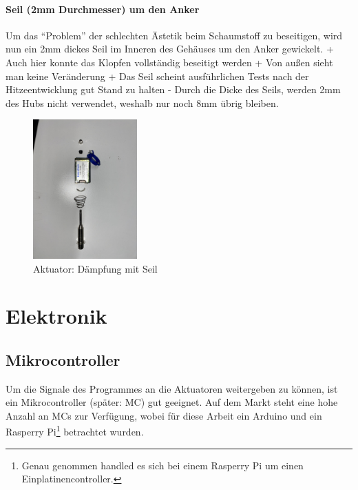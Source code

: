 \paragraph{Seil (2mm Durchmesser) um den Anker}

Um das \enquote{Problem} der schlechten Ästetik beim Schaumstoff zu beseitigen, wird nun ein 2mm dickes Seil im Inneren des Gehäuses um den Anker gewickelt. \newline
+ Auch hier konnte das Klopfen vollständig beseitigt werden \newline
+ Von außen sieht man keine Veränderung \newline
+ Das Seil scheint ausführlichen Tests nach der Hitzeentwicklung gut Stand zu halten  \newline
- Durch die Dicke des Seils, werden 2mm des Hubs nicht verwendet, weshalb nur noch 8mm übrig bleiben.

\begin{figure}[htbp]
	\centering
	\includegraphics [width=4cm] {img/Hubmagnet_Seil_Daempfung.jpg}
	\caption{Aktuator: Dämpfung mit Seil}
\end{figure}



\section{Elektronik}\label{konzeptionHW-elektronik}

\subsection{Mikrocontroller}\label{Ansteuerung}
Um die Signale des Programmes an die Aktuatoren weitergeben zu können, ist ein Mikrocontroller (später: \ac{MC}) gut geeignet.
Auf dem Markt steht eine hohe Anzahl an \ac{MC}s zur Verfügung,
wobei für diese Arbeit ein Arduino und ein Rasperry Pi\footnote{Genau genommen handled es sich bei einem Rasperry Pi um einen Einplatinencontroller.} betrachtet wurden.

